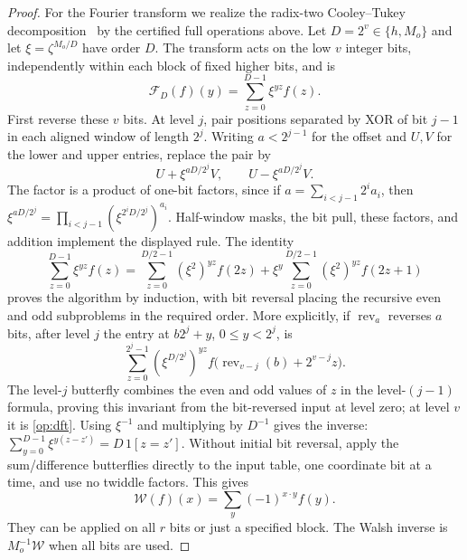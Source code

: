 \begin{proof}
For the Fourier transform we realize the radix-two Cooley--Tukey
decomposition~\cite[pp.~299--300]{CooleyTukey1965} by the certified full
operations above. Let $D=2^v\in\{h,M_o\}$ and let
$\xi=\zeta^{M_o/D}$ have order $D$.
The transform acts on the low $v$ integer bits, independently within
each block of fixed higher bits, and is
\begin{equation}\label{op:dft}
       \mathcal F_D(f)(y)=\sum_{z=0}^{D-1}\xi^{yz}f(z).
\end{equation}
First reverse these $v$ bits.  At level $j$, pair positions separated
by XOR of bit $j-1$ in each aligned window of length $2^j$.
Writing $a<2^{j-1}$ for the offset and $U,V$ for the lower and upper
entries, replace the pair by
\begin{equation}\label{op:butterfly}
          U+\xi^{aD/2^j}V,\qquad U-\xi^{aD/2^j}V.
\end{equation}
The factor is a product of one-bit factors, since if
$a=\sum_{i<j-1}2^ia_i$, then
$\xi^{aD/2^j}=\prod_{i<j-1}(\xi^{2^iD/2^j})^{a_i}$.
Half-window masks, the bit pull, these factors, and addition implement
the displayed rule.  The identity
\[
 \sum_{z=0}^{D-1}\xi^{yz}f(z)
 =\sum_{z=0}^{D/2-1}(\xi^2)^{yz}f(2z)
  +\xi^y\sum_{z=0}^{D/2-1}(\xi^2)^{yz}f(2z+1)
\]
proves the algorithm by induction, with bit reversal placing the
recursive even and odd subproblems in the required order.  More
explicitly, if $\operatorname{rev}_a$ reverses $a$ bits, after level
$j$ the entry at $b2^j+y$, $0\le y<2^j$, is
\[
 \sum_{z=0}^{2^j-1}(\xi^{D/2^j})^{yz}
 f\bigl(\operatorname{rev}_{v-j}(b)+2^{v-j}z\bigr).
\]
The level-$j$ butterfly combines the even and odd values of $z$ in
the level-$(j-1)$ formula, proving this invariant from the bit-reversed
input at level zero; at level $v$ it is \eqref{op:dft}.
Using $\xi^{-1}$ and multiplying by $D^{-1}$ gives the inverse:
$\sum_{y=0}^{D-1}\xi^{y(z-z')}=D\,1[z=z']$.
Without initial bit reversal, apply the sum/difference butterflies
directly to the input table, one coordinate bit at a time, and use
no twiddle factors.  This gives
\begin{equation}\label{op:walsh}
                   \mathcal W(f)(x)=\sum_y(-1)^{x\cdot y}f(y).
\end{equation}
They can be applied on all $r$ bits or just a specified block.
The Walsh inverse is $M_o^{-1}\mathcal W$ when all bits are used.


\end{proof}
